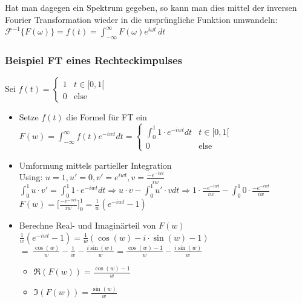 \documentclass[12pt,a4paper]{article}
\newcommand{\nl}{\\[0.1cm]}
\begin{document}
Hat man dagegen ein Spektrum gegeben, so kann man dies mittel der inversen Fourier Transformation wieder in die ursprüngliche Funktion umwandeln:\nl
$\displaystyle \mathcal{F}^{-1}\{F(\omega)\} = f(t) = \int_{-\infty}^\infty F(\omega) e^{i\omega t}\,dt$\nl

\subsubsection{Beispiel FT eines Rechteckimpulses}
Sei $f(t) = \begin{cases}1& t\in[0,1[ \\ 0&\text{else} \end{cases}$
\begin{itemize}
\item Setze $f(t)$ die Formel für FT ein\nl
$\displaystyle F(w) = \int_{-\infty}^{\infty} f(t) e^{-iwt} dt = \begin{cases} \displaystyle\int_0^1 1\cdot e^{-iwt} dt & t\in[0,1[ \\ 0 & \text{else} \end{cases}$
\item Umformung mittels partieller Integration\nl
Using: $u=1, u'=0, v'=e^{iwt}, v=\frac{-e^{-iwt}}{iw}$\nl
$\displaystyle \int_0^1 u\cdot v' = \int_0^1 1\cdot e^{-iwt} dt \Rightarrow u\cdot v - \int_0^1 u'\cdot v dt \Rightarrow 1\cdot \frac{-e^{-iwt}}{iw} - \int_0^1 0\cdot \frac{-e^{-iwt}}{iw}$\nl
$\displaystyle F(w) = \big[\frac{-e^{-iwt}}{iw}\big]^1_0 = \frac{1}{w}(e^{-iwt}-1)$
\item Berechne Real- und Imaginärteil von $F(w)$\nl
$\frac{1}{w}(e^{-iwt}-1) = \frac{1}{w}(\cos(w) - i\cdot \sin(w) -1)$\\
$=\;\frac{\cos(w)}{w} - \frac{1}{w} -\frac{i\sin(w)}{w} = \frac{\cos(w) -1 }{w} - \frac{i\sin(w)}{w}$\nl
\begin{itemize}
\item $\Re(F(w)) = \frac{\cos(w)-1}{w}$
\item $\Im(F(w)) = \frac{\sin(w)}{w}$
\end{itemize}
\end{itemize}
\end{document}
